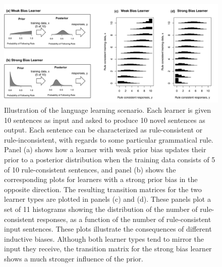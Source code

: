 \documentclass[doc]{apa6}
\begin{document}
\begin{figure}[t]
\begin{center}
\includegraphics[width=15cm]{bbTrans.pdf} 
\caption{{\small Illustration of the language learning scenario. Each learner is given 10 sentences as input and asked to produce 10 novel sentences as output. Each sentence can be characterized as rule-consistent or rule-inconsistent, with regards to some particular grammatical rule. Panel (a) shows how a learner with {\sc weak} prior bias updates their prior to a posterior distribution when the training data consists of 5 of 10 rule-consistent sentences, and panel (b) shows the corresponding plots for learners with a {\sc strong} prior bias in the opposite direction. The resulting transition matrices for the two learner types are plotted in panels (c) and (d). These panels plot a set of 11 histograms showing the distribution of the number of rule-consistent responses, as a function of the number of rule-consistent input sentences. These plots illustrate the consequences of different inductive biases. Although both learner types tend to mirror the input they receive, the transition matrix for the {\sc strong} bias learner shows a much stronger influence of the prior.}}
\label{indbias}
\end{center}
\end{figure}
\end{document}
